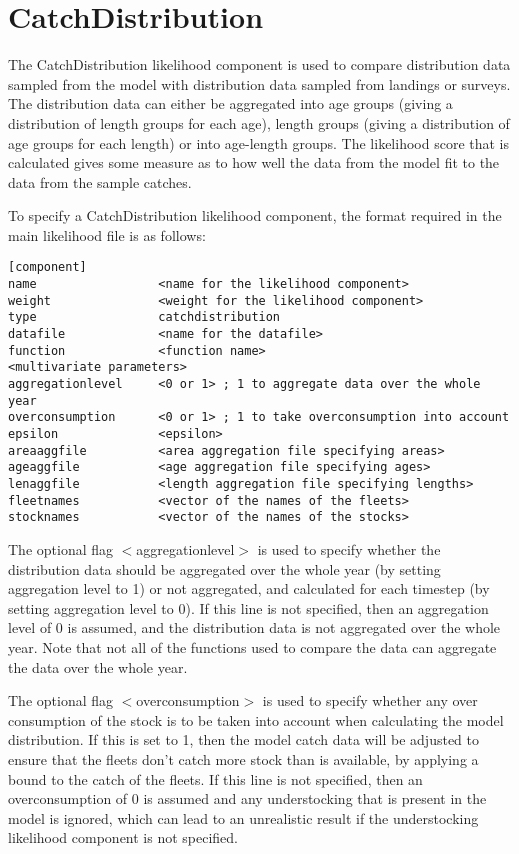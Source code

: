 \documentclass[10pt,twoside]{book}
\begin{document}
\section{CatchDistribution}\label{sec:catchdist}
The CatchDistribution likelihood component is used to compare distribution data sampled from the model with distribution data sampled from landings or surveys.  The distribution data can either be aggregated into age groups (giving a distribution of length groups for each age), length groups (giving a distribution of age groups for each length) or into age-length groups.  The likelihood score that is calculated gives some measure as to how well the data from the model fit to the data from the sample catches.

\bigskip
To specify a CatchDistribution likelihood component, the format required in the main likelihood file is as follows:

{\small\begin{verbatim}
[component]
name                 <name for the likelihood component>
weight               <weight for the likelihood component>
type                 catchdistribution
datafile             <name for the datafile>
function             <function name>
<multivariate parameters>
aggregationlevel     <0 or 1> ; 1 to aggregate data over the whole year
overconsumption      <0 or 1> ; 1 to take overconsumption into account
epsilon              <epsilon>
areaaggfile          <area aggregation file specifying areas>
ageaggfile           <age aggregation file specifying ages>
lenaggfile           <length aggregation file specifying lengths>
fleetnames           <vector of the names of the fleets>
stocknames           <vector of the names of the stocks>
\end{verbatim}}

The optional flag $<$aggregationlevel$>$ is used to specify whether the distribution data should be aggregated over the whole year (by setting aggregation level to 1) or not aggregated, and calculated for each timestep (by setting aggregation level to 0).  If this line is not specified, then an aggregation level of 0 is assumed, and the distribution data is not aggregated over the whole year.  Note that not all of the functions used to compare the data can aggregate the data over the whole year.

\bigskip
The optional flag $<$overconsumption$>$ is used to specify whether any over consumption of the stock is to be taken into account when calculating the model distribution.  If this is set to 1, then the model catch data will be adjusted to ensure that the fleets don't catch more stock than is available, by applying a bound to the catch of the fleets.  If this line is not specified, then an overconsumption of 0 is assumed and any understocking that is present in the model is ignored, which can lead to an unrealistic result if the understocking likelihood component is not specified.
\end{document}
